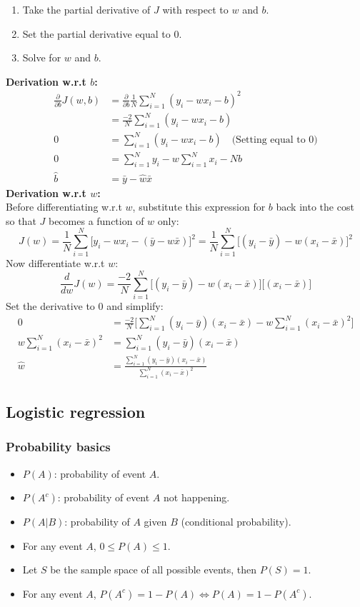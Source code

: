 \documentclass[11pt]{article}
\begin{document}
\begin{enumerate}
    \item Take the partial derivative of $J$ with respect to $w$ and $b$.
    \item Set the partial derivative equal to 0.
    \item Solve for $w$ and $b$.
\end{enumerate}
\begin{note_special}[Derivation]
\textbf{Derivation w.r.t $b$:}
\begin{align*}
    \frac{\partial}{\partial b}J(w,b)&=\frac{\partial}{\partial b}\frac{1}{N}\sum_{i=1}^{N}(y_i-wx_i-b)^2 \\
    &=\frac{-2}{N}\sum_{i=1}^{N}(y_i-wx_i-b) \\
    0&=\sum_{i=1}^N(y_i-wx_i-b) \quad\text{(Setting equal to 0)} \\
    0&=\sum_{i=1}^{N}y_i -w\sum_{i=1}^{N}x_i-Nb \\
    \hat{b}&=\bar{y}-\hat{w}\bar{x}
\end{align*}
\textbf{Derivation w.r.t $w$:}\\
Before differentiating w.r.t $w$, substitute this expression for $b$ back into the cost so that $J$ becomes a function of $w$ only:
$$
J(w)=\frac{1}{N}\sum_{i=1}^{N}\Big[y_i-wx_i-(\bar{y}-w\bar{x})\Big]^2=\frac{1}{N}\sum_{i=1}^{N}\Big[(y_i-\bar{y})-w(x_i-\bar{x})\Big]^2
$$
Now differentiate w.r.t $w$:
$$
\frac{d}{dw}J(w)=\frac{-2}{N}\sum_{i=1}^{N}\big[(y_i-\bar{y})-w(x_i-\bar{x})\big]\big[(x_i-\bar{x})\big]
$$
Set the derivative to 0 and simplify:
\begin{align*}
    0&=\frac{-2}{N}\Big[\sum_{i=1}^{N}(y_i-\bar{y})(x_i-\bar{x})-w\sum_{i=1}^{N}(x_i-\bar{x})^2\Big] \\
    w\sum_{i=1}^{N}(x_i-\bar{x})^2&=\sum_{i=1}^{N}(y_i-\bar{y})(x_i-\bar{x}) \\
    \hat{w}&=\frac{\sum_{i=1}^{N}(y_i-\bar{y})(x_i-\bar{x})}{\sum_{i=1}^{N}(x_i-\bar{x})^2}
\end{align*}
\end{note_special}

\subsection{Logistic regression}
\subsubsection{Probability basics}
\begin{itemize}
    \item $P(A)$: probability of event $A$.
    \item $P(A^c)$: probability of event $A$ not happening.
    \item $P(A|B)$: probability of $A$ given $B$ (conditional probability).
    \item For any event $A$, $0\leq P(A)\leq 1$.
    \item Let $S$ be the sample space of all possible events, then $P(S)=1$.
    \item For any event $A$, $P(A^c)=1-P(A)\iff P(A)=1-P(A^c)$.
\end{itemize}
\end{document}
